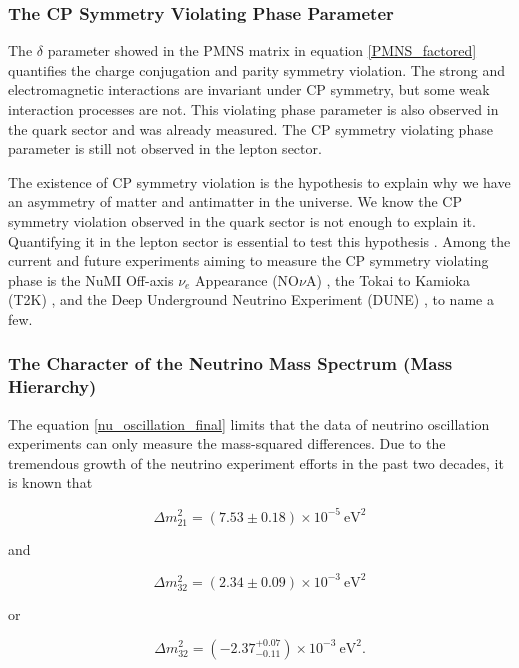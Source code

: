 \subsubsection{The CP Symmetry Violating Phase Parameter}

The $\delta$ parameter showed in the PMNS matrix in equation \ref{PMNS_factored} quantifies the charge conjugation and parity symmetry violation. The strong and electromagnetic interactions are invariant under CP symmetry, but some weak interaction processes are not. This violating phase parameter is also observed in the quark sector and was already measured. The CP symmetry violating phase parameter is still not observed in the lepton sector. 

The existence of CP symmetry violation is the hypothesis to explain why we have an asymmetry of matter and antimatter in the universe. We know the CP symmetry violation observed in the quark sector is not enough to explain it. Quantifying it in the lepton sector is essential to test this hypothesis \cite{cp_violation}. Among the current and future experiments aiming to measure the CP symmetry violating phase is the NuMI Off-axis $\nu_e$ Appearance (NO$\nu$A) \cite{NOVA}, the Tokai to Kamioka (T2K) \cite{T2K}, and the Deep Underground Neutrino Experiment (DUNE) \cite{dune_snowmass_22}, to name a few.

\subsubsection{The Character of the Neutrino Mass Spectrum (Mass Hierarchy)}

The equation \ref{nu_oscillation_final} limits that the data of neutrino oscillation experiments can only measure the mass-squared differences. Due to the tremendous growth of the neutrino experiment efforts in the past two decades, it is known that \cite{delta_2_1, delta_3_2}

\begin{equation}
	\Delta m^2_{21} = (7.53 \pm 0.18) \times 10^{-5} \ \text{eV}^2
	\label{delta_21}
\end{equation}

and 

\begin{equation}
	\Delta m^2_{32} = (2.34 \pm 0.09) \times 10^{-3} \ \text{eV}^2
	\label{delta_32_normal}
\end{equation}

or 

\begin{equation}
	\Delta m^2_{32} = (-2.37^{+0.07}_{-0.11}) \times 10^{-3} \ \text{eV}^2.
	\label{delta_32_inverted}
\end{equation}

